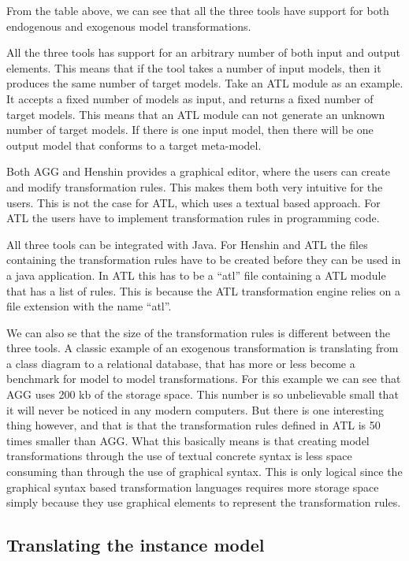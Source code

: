 From the table above, we can see that all the three tools have support
for both endogenous and exogenous model transformations. 

All the three tools has support for an arbitrary number of both input and
output elements. This means that if the tool takes a number of input models, then it
produces the same number of target models. Take an ATL module as an example. It
accepts a fixed number of models as input, and returns a fixed number of target
models. This means that an ATL module can not generate an unknown number of
target models. If there is one input model, then there will be one output model
that conforms to a target meta-model.

Both AGG and Henshin provides a graphical editor, where the users can create and
modify transformation rules. This makes them both very intuitive for the users.
This is not the case for ATL, which uses a textual based approach. For ATL the
users have to implement transformation rules in programming code.

All three tools can be integrated with Java. For Henshin and ATL the files
containing the transformation rules have to be created before they can be used
in a java application. In ATL this has to be a ``atl'' file containing a ATL
module that has a list of rules. This is because the ATL transformation engine
relies on a file extension with the name ``atl''.



We can also se that the size of the transformation rules is different
between the three tools. A classic example of an exogenous transformation is
translating from a class diagram to a relational database, that has more or less become a
benchmark for model to model transformations. For this example we can see that
AGG uses 200 kb of the storage space. This number is so unbelievable small
that it will never be noticed in any modern computers. But there is one
interesting thing however, and that is that the transformation rules defined in
ATL is 50 times smaller than AGG. What this basically means is that creating model
transformations through the use of textual concrete syntax is less space
consuming than through the use of graphical syntax. This is only logical since
the graphical syntax based transformation languages requires more storage
space simply because they use graphical elements to represent the transformation
rules.

\subsection{Translating the instance model}

